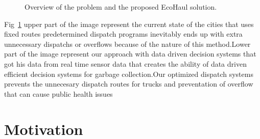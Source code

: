 \documentclass[12pt,a4paper]{report}
\begin{document}
\begin{figure}[htbp]
\centering
{}

\caption{Overview of the problem and the proposed EcoHaul solution.}
\label{fig:problem_overview}
\end{figure}

\indent Fig~\ref{fig:problem_overview} upper part of the image represent the current state of the cities that uses fixed routes  predetermined dispatch programs inevitably ends up with extra unnecessary dispatchs or overflows because of the nature of this method.Lower part of the image represent our approach with data driven decision systems that got his data from real time sensor data that creates the ability of data driven efficient decision systems for garbage collection.Our optimized dispatch systems prevents the unnecesary dispatch routes for trucks and preventation of overflow that can cause public health issues

\section{Motivation}
\end{document}
